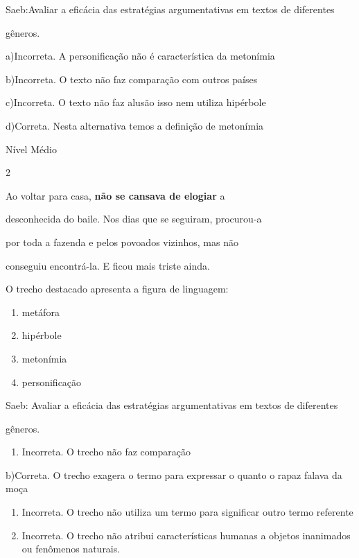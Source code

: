 {{\begin{escolha}
{Saeb:Avaliar a eficácia das estratégias argumentativas em textos de
diferentes

gêneros.

a)Incorreta. A personificação não é característica da metonímia

b)Incorreta. O texto não faz comparação com outros países

c)Incorreta. O texto não faz alusão isso nem utiliza hipérbole

d)Correta. Nesta alternativa temos a definição de metonímia

Nível Médio

\num{2}

Ao voltar para casa, \textbf{não se cansava de elogiar} a

desconhecida do baile. Nos dias que se seguiram, procurou-a

por toda a fazenda e pelos povoados vizinhos, mas não

conseguiu encontrá-la. E ficou mais triste ainda.

O trecho destacado apresenta a figura de linguagem:

\begin{enumerate}
\def\labelenumi{\alph{enumi})}
\item
  metáfora
\item
  hipérbole
\item
  metonímia
\item
  personificação
\end{enumerate}

Saeb: Avaliar a eficácia das estratégias argumentativas em textos de
diferentes

gêneros.

\begin{enumerate}
\def\labelenumi{\arabic{enumi}.}
\tightlist
\item
  Incorreta. O trecho não faz comparação
\end{enumerate}

b)Correta. O trecho exagera o termo para expressar o quanto o rapaz
falava da moça

\begin{enumerate}
\def\labelenumi{\arabic{enumi}.}
\item
  Incorreta. O trecho não utiliza um termo para significar outro termo
  referente
\item
  Incorreta. O trecho não atribui características humanas a objetos
  inanimados ou fenômenos naturais.
\end{enumerate}

}
\end{escolha}}}
